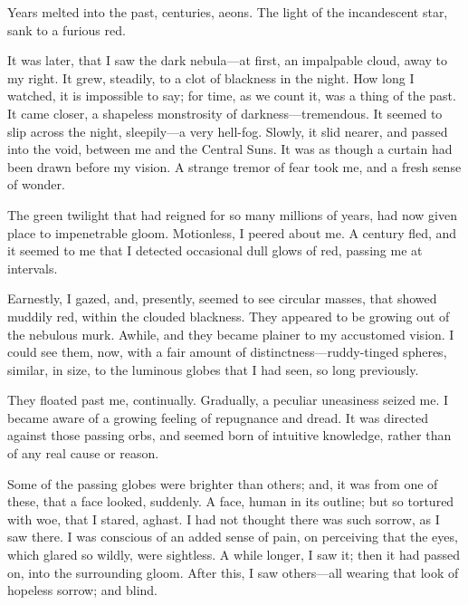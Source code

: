 
\clearpage
\label{ch:16}

\begin{ChapterStart}
\null\null
{}
\end{ChapterStart}

Years melted into the past, centuries, aeons. The light of the incandescent star, sank to a furious red.

It was later, that I saw the dark nebula---at first, an impalpable cloud, away to my right. It grew, steadily, to a clot of blackness in the night. How long I watched, it is impossible to say; for time, as we count it, was a thing of the past. It came closer, a shapeless monstrosity of darkness---tremendous. It seemed to slip across the night, sleepily---a very hell-fog. Slowly, it slid nearer, and passed into the void, between me and the Central Suns. It was as though a curtain had been drawn before my vision. A strange tremor of fear took me, and a fresh sense of wonder.

The green twilight that had reigned for so many millions of years, had now given place to impenetrable gloom. Motionless, I peered about me. A century fled, and it seemed to me that I detected occasional dull glows of red, passing me at intervals.

Earnestly, I gazed, and, presently, seemed to see circular masses, that showed muddily red, within the clouded blackness. They appeared to be growing out of the nebulous murk. Awhile, and they became plainer to my accustomed vision. I could see them, now, with a fair amount of distinctness---ruddy-tinged spheres, similar, in size, to the luminous globes that I had seen, so long previously.

They floated past me, continually. Gradually, a peculiar uneasiness seized me. I became aware of a growing feeling of repugnance and dread. It was directed against those passing orbs, and seemed born of intuitive knowledge, rather than of any real cause or reason.

Some of the passing globes were brighter than others; and, it was from one of these, that a face looked, suddenly. A face, human in its outline; but so tortured with woe, that I stared, aghast. I had not thought there was such sorrow, as I saw there. I was conscious of an added sense of pain, on perceiving that the eyes, which glared so wildly, were sightless. A while longer, I saw it; then it had passed on, into the surrounding gloom. After this, I saw others---all wearing that look of hopeless sorrow; and blind.

